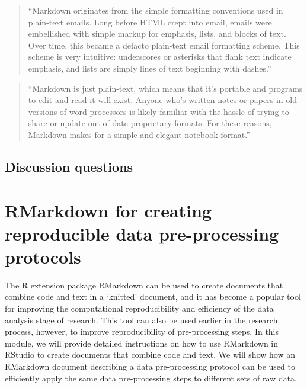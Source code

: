 \documentclass[]{tufte-book}
\begin{document}
\begin{quote}
``Markdown originates from the simple formatting conventions used in plain-text
emails. Long before HTML crept into email, emails were embellished with simple
markup for emphasis, lists, and blocks of text. Over time, this became a defacto
plain-text email formatting scheme. This scheme is very intuitive: underscores or
asterisks that flank text indicate emphasis, and lists are simply lines of text
beginning with dashes.'' \citep{buffalo2015bioinformatics}
\end{quote}

\begin{quote}
``Markdown is just plain-text, which means that it's portable and programs to edit
and read it will exist. Anyone who's written notes or papers in old versions of
word processors is likely familiar with the hassle of trying to share or update
out-of-date proprietary formats. For these reasons, Markdown makes for a simple
and elegant notebook format.'' \citep{buffalo2015bioinformatics}
\end{quote}

\hypertarget{discussion-questions}{%
\subsection{Discussion questions}\label{discussion-questions}}

\hypertarget{rmarkdown-for-creating-reproducible-data-pre-processing-protocols}{%
\section{RMarkdown for creating reproducible data pre-processing protocols}\label{rmarkdown-for-creating-reproducible-data-pre-processing-protocols}}

The R extension package RMarkdown can be used to create documents that combine
code and text in a `knitted' document, and it has become a popular tool for
improving the computational reproducibility and efficiency of the data analysis
stage of research. This tool can also be used earlier in the research process,
however, to improve reproducibility of pre-processing steps. In this module, we
will provide detailed instructions on how to use RMarkdown in RStudio to create
documents that combine code and text. We will show how an RMarkdown document
describing a data pre-processing protocol can be used to efficiently apply the
same data pre-processing steps to different sets of raw data.
\end{document}

